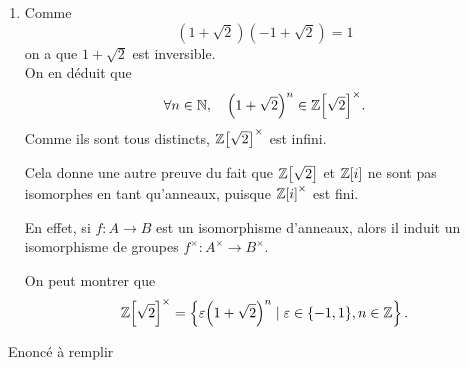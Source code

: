 {\begin{td-sol}[]
\begin{enumerate}
            \item Comme
            \begin{equation*}
                \left(1+\sqrt 2\right)\left(-1+\sqrt 2\right)=1
            \end{equation*}
            on a que \(1+\sqrt 2\) est inversible.\\
            On en déduit que
            \begin{equation*}
                \forall n\in\mathbb{N},\quad {\left(1+\sqrt 2\right)}^n \in {\mathbb{Z}\mathopen{}\left[\sqrt{2}\right]\mathclose{}}^\times.
            \end{equation*}
            Comme ils sont tous distincts, \({\mathbb{Z}\mathopen{}\left[\sqrt{2}\right]\mathclose{}}^\times\) est infini.

            \begin{remark}
                Cela donne une autre preuve du fait que \(\mathbb{Z}\mathopen{}\left[\sqrt{2}\right]\mathclose{}\) 
                et \(\mathbb{Z}[i]\) ne sont pas isomorphes en tant qu'anneaux,
                puisque \({\mathbb{Z}[i]}^\times\) est fini.

                En effet, si \(f:A\to B\) est un isomorphisme d'anneaux, alors
                il induit un isomorphisme de groupes \({f^\times}:{A^\times}\to{B^\times}\).
            \end{remark}

            \begin{remark}
                On peut montrer que
                \begin{equation*}
                    {\mathbb{Z}\mathopen{}\left[\sqrt{2}\right]\mathclose{}}^\times = \left\{\varepsilon {\left(1+\sqrt{2}\right)}^n \mid \varepsilon\in\{-1,1\},n\in\mathbb{Z}\right\}.
                \end{equation*}
            \end{remark}
        \end{enumerate}
    \end{td-sol}
}{}

\begin{td-exo}\, %
    Enoncé à remplir
\end{td-exo}

